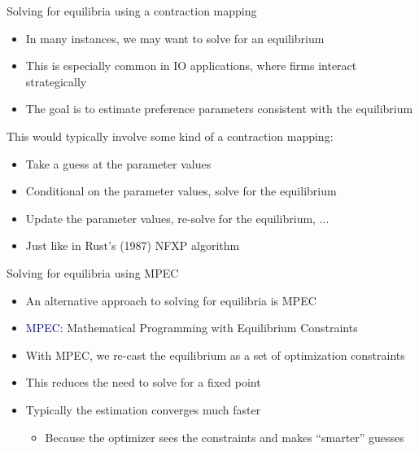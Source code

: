\documentclass[aspectratio=169]{beamer}
\begin{document}
\begin{frame}
Solving for equilibria using a contraction mapping
\bigskip{}
\begin{itemize}
\itemsep1.5em
\item<2-> In many instances, we may want to solve for an equilibrium
\item<3-> This is especially common in IO applications, where firms interact strategically
\item<4-> The goal is to estimate preference parameters consistent with the equilibrium
\end{itemize}
\end{frame}

\begin{frame}
This would typically involve some kind of a contraction mapping:
\bigskip{}
\begin{itemize}
\itemsep1.5em
\item<2-> Take a guess at the parameter values
\item<3-> Conditional on the parameter values, solve for the equilibrium
\item<4-> Update the parameter values, re-solve for the equilibrium, ...
\item<5-> Just like in Rust's (1987) NFXP algorithm
\end{itemize}
\end{frame}

\begin{frame}
Solving for equilibria using MPEC
\bigskip{}
\begin{itemize}
\itemsep1.5em
\item<2-> An alternative approach to solving for equilibria is MPEC
\item<3-> \textcolor{navy}{MPEC:} Mathematical Programming with Equilibrium Constraints
\item<4-> With MPEC, we re-cast the equilibrium as a set of optimization constraints
\item<5-> This reduces the need to solve for a fixed point
\item<6-> Typically the estimation converges much faster
\bigskip\par
\begin{itemize}
\item<7-> Because the optimizer sees the constraints and makes ``smarter'' guesses
\end{itemize}
\end{itemize}
\end{frame}
\end{document}
